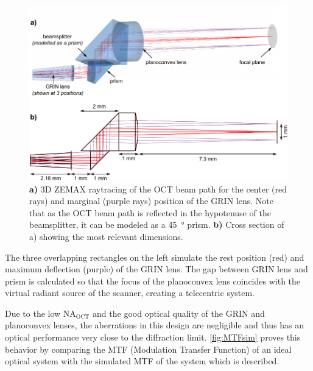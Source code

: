 \begin{figure}[h!]\centering
      \includegraphics{figures/30_DesignSimulation/Optical/beamsplitterAll.pdf}
      \caption{\textbf{a)} 3D ZEMAX raytracing of the OCT beam path for the center (red rays) and marginal (purple rays) position of the GRIN lens. Note that as the OCT beam path is reflected in the hypotenuse of the beamsplitter, it can be modeled as a \SI{45}{\degree} prism.      
      \textbf{b)} Cross section of a) showing the most relevant dimensions.}
      \label{fig:BS}
\end{figure}

The three overlapping rectangles on the left simulate the rest position (red) and maximum deflection (purple) of the GRIN lens. The gap between GRIN lens and prism is calculated so that the focus of the planoconvex lens coincides with the virtual radiant source of the scanner, creating a telecentric system.

	Due to the low $\mathrm{NA_\mathrm{OCT}}$ and the good optical quality of the GRIN and planoconvex lenses, the aberrations in this design are negligible and thus has an optical performance very close to the diffraction limit. \autoref{fig:MTFsim} proves this behavior by comparing the MTF (Modulation Transfer Function) of an ideal optical system with the simulated MTF of the system which is described.

